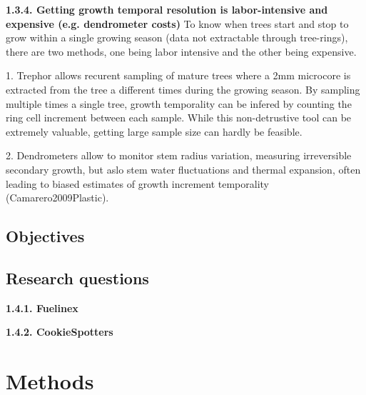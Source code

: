 \documentclass{article}
\begin{document}
\textbf{1.3.4. Getting growth temporal resolution is labor-intensive and expensive (e.g. dendrometer costs)}
To know when trees start and stop to grow within a single growing season (data not extractable through tree-rings), there are two methods, one being labor intensive and the other being expensive. 

1. Trephor allows recurent sampling of mature trees where a 2mm microcore is extracted from the tree a different times during the growing season. By sampling multiple times a single tree, growth temporality can be infered by counting the ring cell increment between each sample. While this non-detrustive tool can be extremely valuable, getting large sample size can hardly be feasible. 

2. Dendrometers allow to monitor stem radius variation, measuring irreversible secondary growth, but aslo stem water fluctuations and thermal expansion, often leading to biased estimates of growth increment temporality (Camarero2009Plastic).



\subsection{Objectives} 

\subsection {Research questions} 

\textbf{1.4.1. Fuelinex}

\textbf{1.4.2. CookieSpotters}


\section{Methods}
\end{document}

